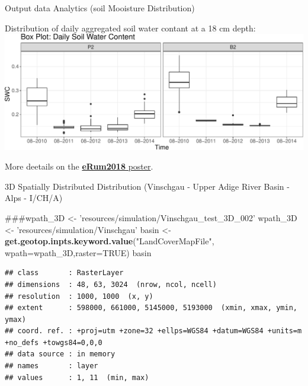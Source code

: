 \documentclass[ignorenonframetext,]{beamer}
\newenvironment{Shaded}{\begin{snugshade}}{\end{snugshade}}
\newcommand{\KeywordTok}[1]{\textcolor[rgb]{0.13,0.29,0.53}{\textbf{#1}}}
\newcommand{\DataTypeTok}[1]{\textcolor[rgb]{0.13,0.29,0.53}{#1}}
\newcommand{\StringTok}[1]{\textcolor[rgb]{0.31,0.60,0.02}{#1}}
\newcommand{\OtherTok}[1]{\textcolor[rgb]{0.56,0.35,0.01}{#1}}
\newcommand{\NormalTok}[1]{#1}
\begin{document}
\begin{frame}{Output data Analytics (soil Mooisture Distribution)}

Distribution of daily aggregated soil water contant at a 18 cm depth:
\includegraphics{presentation_files/figure-beamer/unnamed-chunk-12-1.pdf}

More deetails on the
\href{https://github.com/ecor/geotopbricks_doc/blob/master/erum2018_poster/erum2018_poster_cordano_et_al.png}{\textbf{eRum2018}
poster}.

\end{frame}

\begin{frame}[fragile]{3D Spatially Distributed Distribution (Vinschgau
- Upper Adige River Basin - Alps - I/CH/A)}

\begin{Shaded}
\begin{Highlighting}[]
\NormalTok{###wpath_3D <- 'resources/simulation/Vinschgau_test_3D_002'}
\NormalTok{wpath_3D <-}\StringTok{ 'resources/simulation/Vinschgau'}
\NormalTok{basin <-}\StringTok{ }\KeywordTok{get.geotop.inpts.keyword.value}\NormalTok{(}\StringTok{"LandCoverMapFile"}\NormalTok{,}
              \DataTypeTok{wpath=}\NormalTok{wpath_3D,}\DataTypeTok{raster=}\OtherTok{TRUE}\NormalTok{)}
\NormalTok{basin}
\end{Highlighting}
\end{Shaded}

\begin{verbatim}
## class       : RasterLayer 
## dimensions  : 48, 63, 3024  (nrow, ncol, ncell)
## resolution  : 1000, 1000  (x, y)
## extent      : 598000, 661000, 5145000, 5193000  (xmin, xmax, ymin, ymax)
## coord. ref. : +proj=utm +zone=32 +ellps=WGS84 +datum=WGS84 +units=m +no_defs +towgs84=0,0,0 
## data source : in memory
## names       : layer 
## values      : 1, 11  (min, max)
\end{verbatim}

\end{frame}
\end{document}
